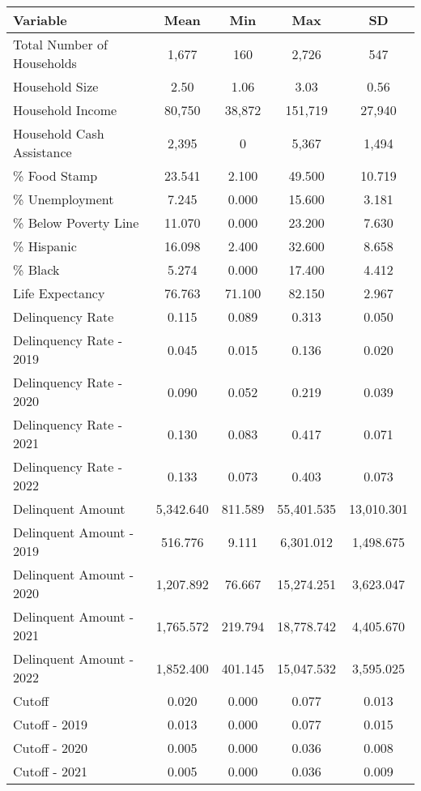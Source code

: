 \begin{tabular}{l|c|c|c|c}
\toprule 
\midrule 
Variable & Mean & Min & Max & SD \\
\midrule 
Total Number of Households & 1,677 & 160 & 2,726 & 547 \\
\quad Household Size & 2.50 & 1.06 & 3.03 & 0.56 \\
Household Income & 80,750 & 38,872 & 151,719 & 27,940 \\
\quad Household Cash Assistance & 2,395 & 0 & 5,367 & 1,494 \\
\% Food Stamp & 23.541 & 2.100 & 49.500 & 10.719 \\
\% Unemployment & 7.245 & 0.000 & 15.600 & 3.181 \\
\% Below Poverty Line & 11.070 & 0.000 & 23.200 & 7.630 \\
\% Hispanic & 16.098 & 2.400 & 32.600 & 8.658 \\
\% Black & 5.274 & 0.000 & 17.400 & 4.412 \\
Life Expectancy & 76.763 & 71.100 & 82.150 & 2.967 \\
\midrule 
Delinquency Rate & 0.115 & 0.089 & 0.313 & 0.050 \\
\quad Delinquency Rate - 2019 & 0.045 & 0.015 & 0.136 & 0.020 \\
\quad Delinquency Rate - 2020 & 0.090 & 0.052 & 0.219 & 0.039 \\
\quad Delinquency Rate - 2021 & 0.130 & 0.083 & 0.417 & 0.071 \\
\quad Delinquency Rate - 2022 & 0.133 & 0.073 & 0.403 & 0.073 \\
\midrule 
Delinquent Amount & 5,342.640 & 811.589 & 55,401.535 & 13,010.301 \\
\quad Delinquent Amount - 2019 & 516.776 & 9.111 & 6,301.012 & 1,498.675 \\
\quad Delinquent Amount - 2020 & 1,207.892 & 76.667 & 15,274.251 & 3,623.047 \\
\quad Delinquent Amount - 2021 & 1,765.572 & 219.794 & 18,778.742 & 4,405.670 \\
\quad Delinquent Amount - 2022 & 1,852.400 & 401.145 & 15,047.532 & 3,595.025 \\
\midrule 
Cutoff & 0.020 & 0.000 & 0.077 & 0.013 \\
\quad Cutoff - 2019 & 0.013 & 0.000 & 0.077 & 0.015 \\
\quad Cutoff - 2020 & 0.005 & 0.000 & 0.036 & 0.008 \\
\quad Cutoff - 2021 & 0.005 & 0.000 & 0.036 & 0.009 \\

\end{tabular}
